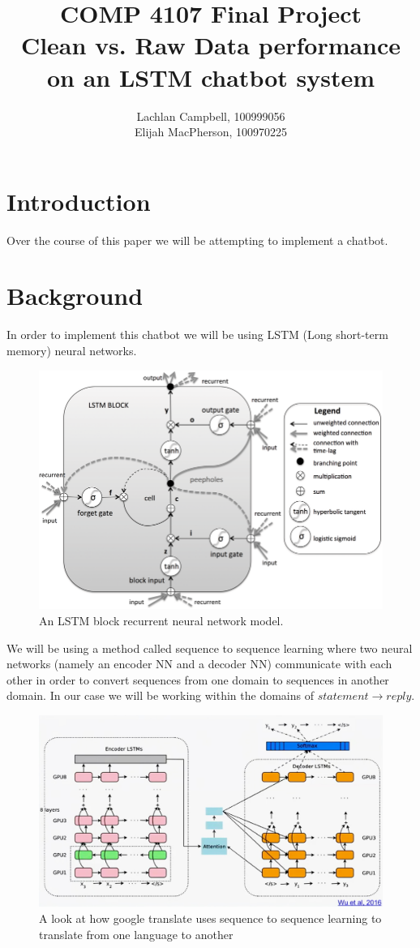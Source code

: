 \documentclass[titlepage]{article}
\begin{document}
\title{COMP 4107 Final Project\\
         {\small Clean vs. Raw Data performance on an LSTM chatbot system}}
\author{Lachlan Campbell, 100999056\\
              Elijah MacPherson, 100970225}
\maketitle

\section{Introduction}
Over the course of this paper we will be attempting to implement a chatbot.

\section{Background}
In order to implement this chatbot we will be using LSTM (Long short-term memory) neural networks.
\begin{figure}[H]
	\centering
	\includegraphics[width=120mm]{LSTM-model.png}
	\caption{An LSTM block recurrent neural network model.}
	\label{fig:lstm1}
\end{figure}
We will be using a method called sequence to sequence learning where two neural networks (namely an encoder NN and a decoder NN) communicate with each other in order to convert sequences from one domain to sequences in another domain. In our case we will be working within the domains of $statement\rightarrow reply$.
\begin{figure}[H]
	\centering
	\includegraphics[width=120mm]{Seq2seq.jpg}
	\caption{A look at how google translate uses sequence to sequence learning to translate from one language to another}
	\label{fig:seq2seqgoogletranslate}
\end{figure}
\end{document}
